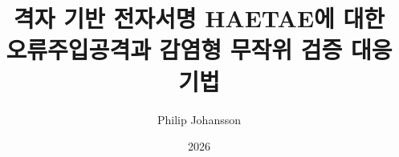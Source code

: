 \documentclass[11pt]{article}
\title{격자 기반 전자서명 HAETAE에 대한\\
       오류주입공격과 감염형 무작위 검증 대응기법}
\author{Philip Johansson}
\date{2026}
\begin{document}
\maketitle

\begin{abstract}

\end{abstract}

{\renewcommand{\abstractname}{Abstract}%
\begin{abstract}

\end{abstract}}









\newpage
\appendix


\newpage


\end{document}
